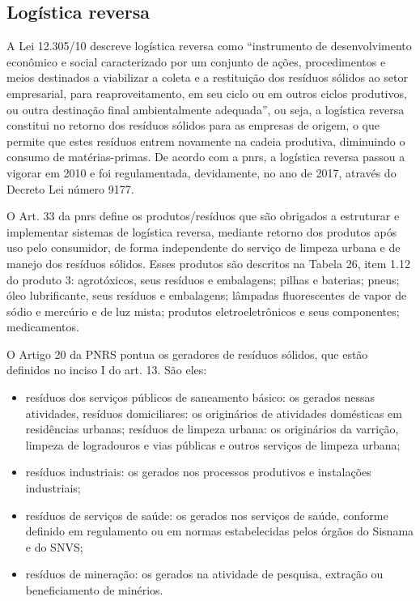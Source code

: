 \subsection{Logística reversa}

A Lei 12.305/10 descreve logística reversa como “instrumento de desenvolvimento econômico e social caracterizado por um conjunto de ações, procedimentos e meios destinados a viabilizar a coleta e a restituição dos resíduos sólidos ao setor empresarial, para reaproveitamento, em seu ciclo ou em outros ciclos produtivos, ou outra destinação final ambientalmente adequada”, ou seja, a logística reversa constitui no retorno dos resíduos sólidos para as empresas de origem, o que permite que estes resíduos entrem novamente na cadeia produtiva, diminuindo o consumo de matérias-primas. De acordo com a \gls{pnrs}, a logística reversa passou a vigorar em 2010 e foi regulamentada, devidamente, no ano de 2017, através do Decreto Lei número 9177.

O Art. 33 da \gls{pnrs} define os produtos/resíduos que são obrigados a estruturar e implementar sistemas de logística reversa, mediante retorno dos produtos após uso pelo consumidor, de forma independente do serviço de limpeza urbana e de manejo dos resíduos sólidos. Esses produtos são descritos na Tabela 26, item 1.12 do produto 3: agrotóxicos, seus resíduos e embalagens; pilhas e baterias; pneus; óleo lubrificante, seus resíduos e embalagens; lâmpadas fluorescentes de vapor de sódio e mercúrio e de luz mista; produtos eletroeletrônicos e seus componentes; medicamentos.

O Artigo 20 da PNRS pontua os geradores de resíduos sólidos, que estão definidos no inciso I do art. 13. São eles: 

\begin{itemize}
	\item resíduos dos serviços públicos de saneamento básico: os gerados nessas atividades, 
	\subitem resíduos domiciliares: os originários de atividades domésticas em residências urbanas; 
	\subitem resíduos de limpeza urbana: os originários da varrição, limpeza de logradouros e vias públicas e
	outros serviços de limpeza urbana; 
	\item resíduos industriais: os gerados nos processos produtivos e instalações industriais;  
	\item resíduos de serviços de saúde: os gerados nos serviços de saúde, conforme definido em regulamento ou em normas estabelecidas pelos órgãos do Sisnama e do SNVS; 
	\item resíduos de mineração: os gerados na atividade de pesquisa, extração ou beneficiamento de
	minérios.
\end{itemize}


